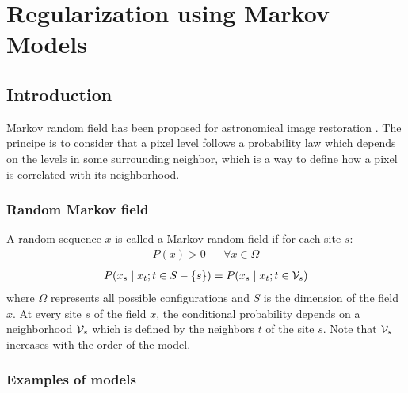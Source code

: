\documentclass[11pt,a4paper]{article}
\begin{document}




\section{Regularization using Markov Models}

\subsection{Introduction}
% 
Markov random field has been proposed for astronomical image restoration
\cite{rest:hunt94,rest:molina96,rest:katsa95}. The principe is to consider
that a pixel level follows a probability law which depends on the levels
in some surrounding neighbor, which is a way to define how a pixel is
correlated with its neighborhood.

\subsubsection*{Random Markov field}

A random sequence $x$ is called a Markov random field if for each site $s$:
\begin{eqnarray}
P({x}) > 0 && \forall {x}\in \Omega  
\end{eqnarray}
\begin{eqnarray}
P(x_s \mid x_t;t\in S-\{s\}) = P(x_s \mid x_t;t\in{{\cal V}_s}) 
\end{eqnarray}
where $\Omega$ represents all possible configurations and $S$ is the dimension of
the field $x$.
At every site $s$ of the field $x$, the conditional probability  
depends on a neighborhood ${\cal V}_s$ which is defined by the neighbors $t$ of the 
site $s$. Note that ${\cal V}_s$ increases with the order of the model.

\subsubsection*{Examples of models}
\end{document}
